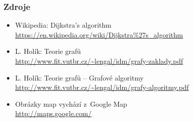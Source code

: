 \documentclass[10pt,xcolor=pdflatex,hyperref={unicode,hidelinks}]{beamer}
\begin{document}
\begin{frame}\frametitle{Zdroje}
    \renewcommand\UrlFont{\ttfamily\footnotesize}
    
    \begin{itemize}
        \item Wikipedia: Dijkstra's algorithm\\
        \url{https://en.wikipedia.org/wiki/Dijkstra\%27s\_algorithm}
        \item L. Holík: Teorie grafů\\
        \url{http://www.fit.vutbr.cz/~lengal/idm/grafy-zaklady.pdf}
        \item L. Holík: Teorie grafů -- Grafové algoritmy\\
        \url{http://www.fit.vutbr.cz/~lengal/idm/grafy-algoritmy.pdf}
        \item Obrázky map vychází z~Google Map\\
        \url{http://maps.google.com/}
    \end{itemize}
\end{frame}

\end{document}
